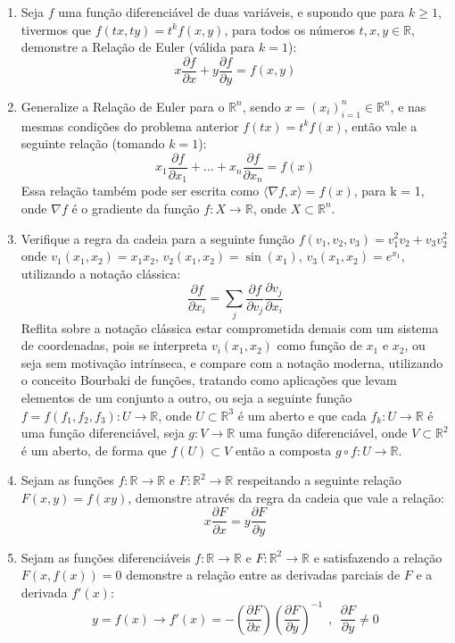\begin{enumerate}
	\item Seja $f$ uma função diferenciável de duas variáveis, e supondo que para $k \geq 1$, tivermos que $f(tx,ty) = t^kf(x,y)$, para todos os números $t,x,y \in \mathbb{R}$, demonstre a Relação de Euler (válida para $k = 1$):
	\[x\frac{\partial f}{\partial x} + y\frac{\partial f}{\partial y} =  f(x,y)\]
	\item Generalize a Relação de Euler para o $\mathbb{R}^n$, sendo $x = (x_i)_{i=1}^{n}\in\mathbb{R}^n$, e nas mesmas condições do problema anterior $f(tx) = t^kf(x)$, então vale a seguinte relação (tomando $k = 1$):
	\[x_1\frac{\partial f}{\partial x_1} + \ldots + x_n\frac{\partial f}
	{\partial x_n} =  f(x)\]
	Essa relação também pode ser escrita como $\langle \nabla f, x \rangle = f(x)$, para k = 1, onde $\nabla f$ é o gradiente da função $f:X\to\mathbb{R}$, onde $X\subset\mathbb{R}^n$.
	\item Verifique a regra da cadeia para a seguinte função $f(v_1,v_2,v_3) = v_1^2v_2+v_3v_2^2$ onde $v_1(x_1,x_2) = x_1x_2$, $v_2(x_1,x_2) = \sin(x_1)$, $v_3(x_1,x_2) = e^{x_1}$, utilizando a notação clássica:
	\[
	\frac{\partial f}{\partial x_i} = \sum_{j}\frac{\partial f}{\partial v_j}
	\frac{\partial v_j}{\partial x_i}
	\]
	 Reflita sobre a notação clássica estar comprometida demais com um sistema de coordenadas, pois se interpreta $v_i(x_1,x_2)$ como função de $x_1$ e $x_2$, ou seja sem motivação intrínseca, e compare com a notação moderna, utilizando o conceito Bourbaki de funções, tratando como aplicações que 
	 levam elementos de um conjunto a outro, ou seja a seguinte função $f = f(f_1,f_2,f_3):U\to\mathbb{R}$, onde $U\subset\mathbb{R}^3$ é um aberto e que cada $f_k:U\to\mathbb{R}$ é uma função diferenciável, seja $g:V\to
	 \mathbb{R}$ uma função diferenciável, onde $V\subset\mathbb{R}^2$ é um aberto, de forma que $f(U) \subset V$ então a composta $g\circ f:U\to \mathbb{R}$.
	\item Sejam as funções $f:\mathbb{R}\to\mathbb{R}$ e $F:\mathbb{R}^2\to \mathbb{R}$ respeitando a seguinte relação $F(x,y) = f(xy)$, demonstre através da regra da cadeia que vale a relação:
	\[
	x \frac{\partial F}{\partial x} = y \frac{\partial F}{\partial y}
	\]
	\item Sejam as funções diferenciáveis $f:\mathbb{R}\to\mathbb{R}$ e $F:\mathbb{R}^2\to\mathbb{R}$ e satisfazendo a relação $F(x,f(x)) = 0$ demonstre a relação entre as derivadas parciais de $F$ e a derivada $f'(x)$:
	\[
	y = f(x) \rightarrow f'(x) = - \left(\frac{\partial F}{\partial x}\right) 
	\left(\frac{\partial F}{\partial y}\right)^{-1} \ \ , \ \
	\frac{\partial F}{\partial y} \neq 0
	\] 
\end{enumerate}


